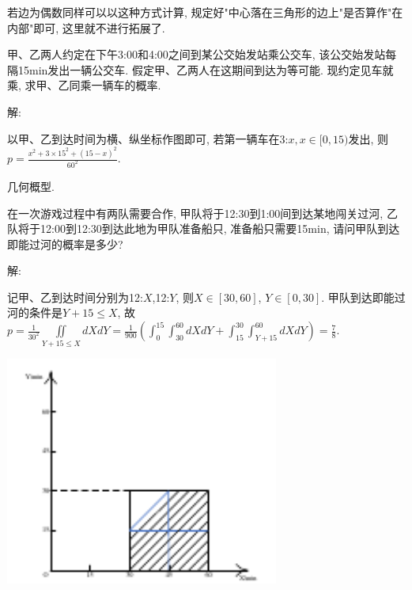 \documentclass[standard]{ExBook}
\begin{document}
\begin{qitems}
\begin{bbox}
\textcolor{themeColor}{\selectfont {} 若边为偶数同样可以以这种方式计算, 规定好"中心落在三角形的边上"是否算作"在内部"即可, 这里就不进行拓展了.}
    \end{bbox}

\vspace{-5em}

    \begin{bbox}
    \begin{shaded}
        \qitem
甲、乙两人约定在下午3:00和4:00之间到某公交始发站乘公交车, 该公交始发站每隔15min发出一辆公交车. 假定甲、乙两人在这期间到达为等可能. 现约定见车就乘, 求甲、乙同乘一辆车的概率.
    \end{shaded}
    \end{bbox}

\vspace{-5em}

    \begin{bbox}
解: 

以甲、乙到达时间为横、纵坐标作图即可, 若第一辆车在3:$x,x\in[0,15)$发出, 则$p=\frac{x^2+3\times15^2+(15-x)^2}{60^2}$.

\textcolor{themeColor}{\selectfont {} 几何概型.}
    \end{bbox}

\vspace{-5em}

    \begin{bbox}
    \begin{shaded}
        \qitem
在一次游戏过程中有两队需要合作, 甲队将于12:30到1:00间到达某地闯关过河, 乙队将于12:00到12:30到达此地为甲队准备船只, 准备船只需要15min, 请问甲队到达即能过河的概率是多少?
    \end{shaded}
    \end{bbox}

\vspace{-5em}

    \begin{bbox}
解: 

记甲、乙到达时间分别为12:$X$,12:$Y$, 则$X\in[30,60]$, $Y\in[0,30]$. 甲队到达即能过河的条件是$Y+15 \leq X$, 故$p=\frac{1}{30^2}\iint\limits_{Y+15 \leq X}dXdY=\frac{1}{900}(\int_{0}^{15}\int_{30}^{60}dXdY+\int_{15}^{30}\int_{Y+15}^{60}dXdY)=\frac{7}{8}$.

\begin{minipage}{9cm}
    \centering
    \includegraphics[width=9cm]{img/1.18.pdf}
\end{minipage}


\end{bbox}
\end{qitems}
\end{document}

